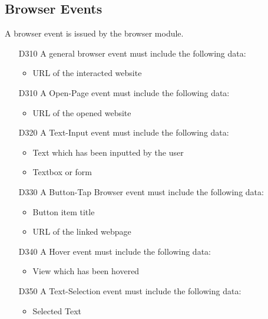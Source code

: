 \subsection{Browser Events}

A browser event is issued by the browser module.

\begin{itemize}
\item[D310] A general browser event must include the following data:
	\begin{itemize}
	\item URL of the interacted website
	\end{itemize}

\item[D310] A Open-Page event must include the following data:
	\begin{itemize}
	\item URL of the opened website
	\end{itemize}
	
\item[D320] A Text-Input event must include the following data:
	\begin{itemize}
	\item Text which has been inputted by the user
	\item Textbox or form
	\end{itemize}
	
\item[D330] A Button-Tap Browser event must include the following data:
	\begin{itemize}
	\item Button item title
	\item URL of the linked webpage
	\end{itemize}
	
\item[D340] A Hover event must include the following data:
	\begin{itemize}
	\item View which has been hovered
	\end{itemize}
	
\item[D350] A Text-Selection event must include the following data:
	\begin{itemize}
	\item Selected Text
	\end{itemize}
\end{itemize}